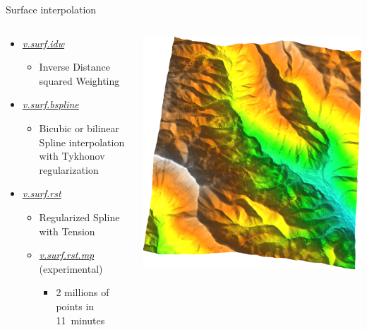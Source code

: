 \documentclass[xcolor={dvipsnames,usenames},beamer,aspectratio=169]{beamer}
\newcommand{\gmodule}[1]{\href{http://grass.osgeo.org/grass71/manuals/#1.html}{\emph{#1}}}
\begin{document}
\begin{frame}{Surface interpolation}

\begin{columns}
\begin{column}{0.5\textwidth}

\begin{itemize}
  \item \gmodule{v.surf.idw}
  \begin{itemize}
    \item Inverse Distance squared Weighting
  \end{itemize}
  \item \gmodule{v.surf.bspline}
  \begin{itemize}
    \item Bicubic or bilinear Spline interpolation with Tykhonov regularization
  \end{itemize}
  \item \gmodule{v.surf.rst}
  \begin{itemize}
    \item Regularized Spline with Tension
    \item \gmodule{v.surf.rst.mp} (experimental)
    \begin{itemize}
      \item 2 millions of points in 11~minutes
    \end{itemize}
  \end{itemize}
\end{itemize}

\end{column}
\begin{column}{0.4\textwidth}

\begin{center}
\includegraphics[width=\textwidth]{features/surface}
\end{center}


\end{column}
\end{columns}
\end{frame}
\end{document}
